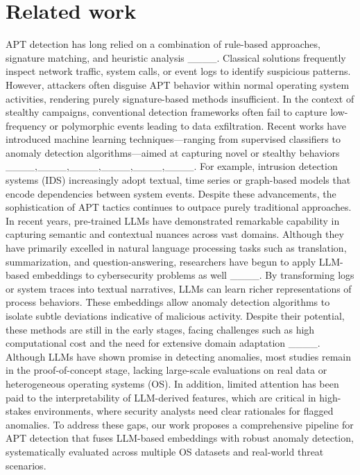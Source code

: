 \section{Related work}
APT detection has long relied on a combination of rule-based approaches, signature matching, and heuristic analysis ____. Classical solutions frequently inspect network traffic, system calls, or event logs to identify suspicious patterns. However, attackers often disguise APT behavior within normal operating system activities, rendering purely signature-based methods insufficient. In the context of stealthy campaigns, conventional detection frameworks often fail to capture low-frequency or polymorphic events leading to data exfiltration. Recent works have introduced machine learning techniques—ranging from supervised classifiers to anomaly detection algorithms—aimed at capturing novel or stealthy behaviors ____,____,____,____,____,____. For example, intrusion detection systems (IDS) increasingly adopt textual, time series or graph-based models that encode dependencies between system events. Despite these advancements, the sophistication of APT tactics continues to outpace purely traditional approaches.\\
In recent years, pre-trained LLMs have demonstrated remarkable capability in capturing semantic and contextual nuances across vast domains. Although they have primarily excelled in natural language processing tasks such as translation, summarization, and question-answering, researchers have begun to apply LLM-based embeddings to cybersecurity problems as well ____. By transforming logs or system traces into textual narratives, LLMs can learn richer representations of process behaviors. These embeddings allow anomaly detection algorithms to isolate subtle deviations indicative of malicious activity.
%
Despite their potential, these methods are still in the early stages, facing challenges such as high computational cost and the need for extensive domain adaptation ____.\\
Although LLMs have shown promise in detecting anomalies, most studies remain in the proof-of-concept stage, lacking large-scale evaluations on real data or heterogeneous operating systems (OS). In addition, limited attention has been paid to the interpretability of LLM-derived features, which are critical in high-stakes environments, where security analysts need clear rationales for flagged anomalies. To address these gaps, our work proposes a comprehensive pipeline for APT detection that fuses LLM-based embeddings with robust anomaly detection, systematically evaluated across multiple OS datasets and real-world threat scenarios.
%